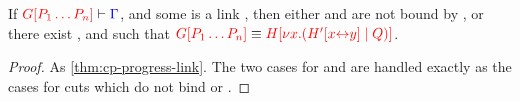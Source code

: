 \begin{lemmaB}\label{thm:nc-progress-link}
  If $\seq[{ \cpPlug{G}{P_1 \dots P_n} }]{ \Gamma }$, and some  is a
  link , then either  and  are not bound by
  , or there exist ,  and  such that
  $\tm{\cpPlug{G}{P_1 \dots P_n}} \equiv \tm{\cpPlug{H}{\cpCut{x}{\cpPlug{H'}{\cpLink{x}{y}}}{Q}}}$.
\end{lemmaB}
\begin{proof}
  As \cref{thm:cp-progress-link}. The two cases for
  and
  are handled exactly as the cases for cuts which do not bind  or .
\end{proof}

